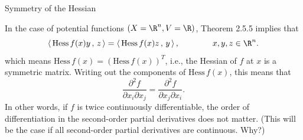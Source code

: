 \documentclass[smaller,hyperref={CJKbookmarks=true}]{beamer}
\newcommand{\scp}[2]{\left\langle\,#1\,,\,#2\,\right\rangle} \newcommand{\scpp}{\langle\,\cdot\,,\,\cdot\,\rangle}
\begin{document}
\begin{frame}[t]{Symmetry of the Hessian}
\begin{spacing}{1.05}
In the case of potential functions $(X=\R^n,V=\R)$, Theorem 2.5.5 implies that
\[\scp{\text{Hess}\,f(x)y}{z}=\scp{\text{Hess}\,f(x)z}{y},
\qquad\qquad x,y,z\in\R^n.\]
which means $\text{Hess}\,f(x)=(\text{Hess}\,f(x))^T$, i.e., the Hessian of $f$ at $x$ is a symmetric matrix. Writing out the components of $\text{Hess}\,f(x)$, this means that
\[\frac{\partial^2f}{\partial x_i\partial x_j}=\frac{\partial^2f}{\partial x_j\partial x_i}.\]
In other words, if $f$ is twice continuously dif{}ferentiable, the order of
dif{}ferentiation in the second-order partial derivatives does not matter.
(This will be the case if all second-order partial derivatives are continuous.
Why?)
\end{spacing}
\end{frame}
\end{document}
